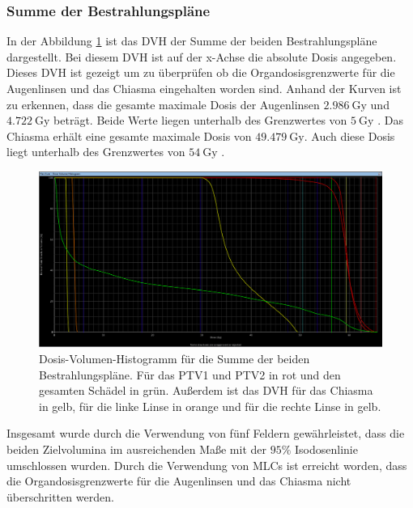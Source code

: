\subsubsection*{Summe der Bestrahlungspläne}

In der Abbildung \ref{abb:DVHsum} ist das DVH der Summe der beiden Bestrahlungspläne dargestellt.
Bei diesem DVH ist auf der x-Achse die absolute Dosis angegeben. Dieses DVH ist gezeigt um zu überprüfen ob
die Organdosisgrenzwerte für die Augenlinsen und das Chiasma eingehalten worden sind.
Anhand der Kurven ist zu erkennen, dass die gesamte maximale Dosis der Augenlinsen $\SI{2.986}{\gray}$ und $\SI{4.722}{\gray}$ beträgt.
Beide Werte liegen unterhalb des Grenzwertes von $\SI{5}{\gray}$ \cite{grenz}.
Das Chiasma erhält eine gesamte maximale Dosis von $\SI{49.479}{\gray}$. Auch diese Dosis liegt unterhalb
des Grenzwertes von $\SI{54}{\gray}$ \cite{grenz}.

\begin{figure}[H]
  \centering
  \includegraphics[width=\textwidth]{Bilder/Teilhirn_vergleich2.png}
  \caption{Dosis-Volumen-Histogramm für die Summe der beiden Bestrahlungspläne. Für das PTV1 und PTV2 in rot und den gesamten Schädel in grün. Außerdem ist das DVH für das Chiasma in gelb, für die linke Linse in orange und für die rechte Linse in gelb.}
  \label{abb:DVHsum}
\end{figure}


Insgesamt wurde durch die Verwendung von fünf Feldern gewährleistet, dass die
beiden Zielvolumina im ausreichenden Maße mit der $95\%$ Isodosenlinie umschlossen wurden.
Durch die Verwendung von MLCs ist erreicht worden, dass die Organdosisgrenzwerte für
die Augenlinsen und das Chiasma nicht überschritten werden.
